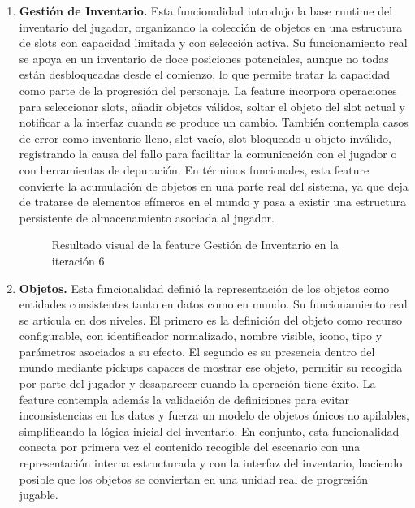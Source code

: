 \begin{enumerate}
\item \textbf{Gestión de Inventario.} Esta funcionalidad introdujo la base runtime del
inventario del jugador, organizando la colección de objetos en una estructura de slots con
capacidad limitada y con selección activa. Su funcionamiento real se apoya en un inventario
de doce posiciones potenciales, aunque no todas están desbloqueadas desde el comienzo, lo
que permite tratar la capacidad como parte de la progresión del personaje. La feature
incorpora operaciones para seleccionar slots, añadir objetos válidos, soltar el objeto del
slot actual y notificar a la interfaz cuando se produce un cambio. También contempla casos
de error como inventario lleno, slot vacío, slot bloqueado u objeto inválido, registrando
la causa del fallo para facilitar la comunicación con el jugador o con herramientas de
depuración. En términos funcionales, esta feature convierte la acumulación de objetos en una
parte real del sistema, ya que deja de tratarse de elementos efímeros en el mundo y pasa a
existir una estructura persistente de almacenamiento asociada al jugador.

\begin{figure}[H]
\begin{center}
\caption{Resultado visual de la feature Gestión de Inventario en la iteración 6}
\label{fig:iteracion6-feature-inventario}
\end{center}
\end{figure}

\item \textbf{Objetos.} Esta funcionalidad definió la representación de los objetos como
entidades consistentes tanto en datos como en mundo. Su funcionamiento real se articula en
dos niveles. El primero es la definición del objeto como recurso configurable, con
identificador normalizado, nombre visible, icono, tipo y parámetros asociados a su efecto.
El segundo es su presencia dentro del mundo mediante pickups capaces de mostrar ese objeto,
permitir su recogida por parte del jugador y desaparecer cuando la operación tiene éxito.
La feature contempla además la validación de definiciones para evitar inconsistencias en los
datos y fuerza un modelo de objetos únicos no apilables, simplificando la lógica inicial del
inventario. En conjunto, esta funcionalidad conecta por primera vez el contenido recogible
del escenario con una representación interna estructurada y con la interfaz del inventario,
haciendo posible que los objetos se conviertan en una unidad real de progresión jugable.


\end{enumerate}
